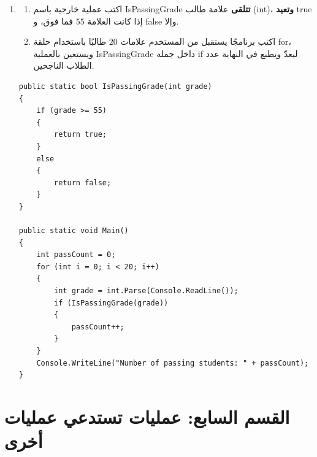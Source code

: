 \documentclass[14pt]{extarticle}
\begin{document}
\begin{enumerate}[resume, itemsep=2em]
\item
\begin{enumerate}
    \item اكتب عملية خارجية باسم \textenglish{IsPassingGrade} \textbf{تتلقى} علامة طالب (\textenglish{int})، \textbf{وتعيد} \textenglish{true} إذا كانت العلامة $55$ فما فوق، و \textenglish{false} وإلا.
    \item اكتب برنامجًا يستقبل من المستخدم علامات $20$ طالبًا باستخدام حلقة \textenglish{for}، ويستعين بالعملية \textenglish{IsPassingGrade} داخل جملة \textenglish{if} ليعدّ ويطبع في النهاية عدد الطلاب الناجحين.
\end{enumerate}
\ifwithsols
\begin{boxSolution}
\begin{english}
\begin{verbatim}
public static bool IsPassingGrade(int grade)
{
    if (grade >= 55)
    {
        return true;
    }
    else
    {
        return false;
    }
}

public static void Main()
{
    int passCount = 0;
    for (int i = 0; i < 20; i++)
    {
        int grade = int.Parse(Console.ReadLine());
        if (IsPassingGrade(grade))
        {
            passCount++;
        }
    }
    Console.WriteLine("Number of passing students: " + passCount);
}
\end{verbatim}
\end{english}
\end{boxSolution}
\fi
\filbreak

\end{enumerate}

\filbreak
\section*{القسم السابع: عمليات تستدعي عمليات أخرى}
\end{document}
